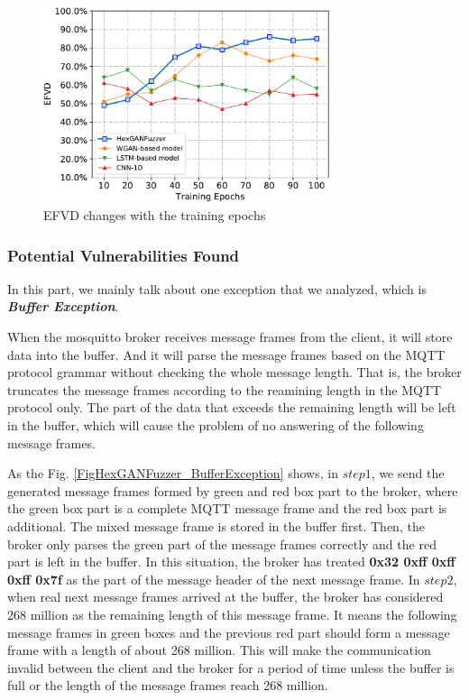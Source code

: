 \begin{figure}[t]
	\centering
	\includegraphics[width=3.3in]{FIGURE_EFVD.pdf}
	\caption{EFVD changes with the training epochs}
	\label{FIGURE_EFVD}
\end{figure}

\subsubsection{Potential Vulnerabilities Found}
In this part, we mainly talk about one exception that we analyzed, which is \textit{\textbf{Buffer Exception}}.

When the mosquitto broker receives message frames from the client, it will store data into the buffer. And it will parse the message frames based on the MQTT protocol grammar without checking the whole message length. That is, the broker truncates the message frames according to the reamining length in the MQTT protocol only. The part of the data that exceeds the remaining length will be left in the buffer, which will cause the problem of no answering of the following message frames.

As the Fig. \ref{FigHexGANFuzzer_BufferException} shows, in $step1$, we send the generated message frames formed by green and red box part to the broker, where the green box part is a complete MQTT message frame and the red box part is additional. The mixed message frame is stored in the buffer first. Then, the broker only parses the green part of the message frames correctly and the red part is left in the buffer. In this situation, the broker has treated \textbf{0x32 0xff 0xff 0xff 0x7f} as the part of the message header of the next message frame. In $step2$, when real next message frames arrived at the buffer, the broker has considered 268 million as the remaining length of this message frame. It means the following message frames in green boxes and the previous red part should form a message frame with a length of about 268 million. This will make the communication invalid between the client and the broker for a period of time unless the buffer is full or the length of the message frames reach 268 million.

